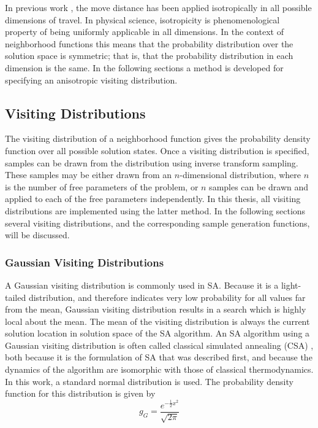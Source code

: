 \documentclass[11pt]{afthesis}
\begin{document}
	In previous work \cite{tsallis1996generalizedsimulatedannealing}, the move distance has been applied isotropically in all possible dimensions of travel. In physical science, isotropicity is phenomenological property of being uniformly applicable in all dimensions. In the context of neighborhood functions this means that the probability distribution over the solution space is symmetric; that is, that the probability distribution in each dimension is the same. In the following sections a method is developed for specifying an anisotropic visiting distribution.
	
	
	\subsection{Visiting Distributions}

	
	The visiting distribution of a neighborhood function gives the probability density function over all possible solution states. Once a visiting distribution is specified, samples can be drawn from the distribution using inverse transform sampling. These samples may be either drawn from an $n$-dimensional distribution, where $n$ is the number of free parameters of the problem, or $n$ samples can be drawn and applied to each of the free parameters independently. In this thesis, all visiting distributions are implemented using the latter method. In the following sections several visiting distributions, and the corresponding sample generation functions, will be discussed.
	
	\label{scn:visiting_distributions}
	
	\subsubsection{Gaussian Visiting Distributions}
	\label{scn:classical_visiting}
	
	A Gaussian visiting distribution is commonly used in SA. Because it is a light-tailed distribution, and therefore indicates very low probability for all values far from the mean, Gaussian visiting distribution results in a search which is highly local about the mean. The mean of the visiting distribution is always the current solution location in solution space of the SA algorithm. An SA algorithm using a Gaussian visiting distribution is often called classical simulated annealing (CSA) \cite{tsallis1996generalizedsimulatedannealing}, both because it is the formulation of SA that was described first, and because the dynamics of the algorithm are isomorphic with those of classical thermodynamics. In this work, a standard normal distribution is used. The probability density function for this distribution is given by 
	\begin{equation}
	g_G = \frac{e^{-\frac{1}{2} x^2}}{\sqrt{2\pi}}
	\label{eq:normal_pdf}
	\end{equation}
	
\end{document}

